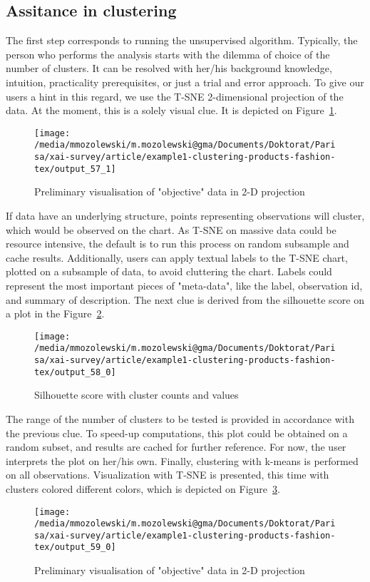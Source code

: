 \documentclass[
 twocolumn,
]{ceurart}
\begin{document}
\subsection{Assitance in clustering}
The first step corresponds to running the unsupervised algorithm.
Typically, the person who performs the analysis starts with the dilemma of choice of the number of clusters.
It can be resolved with her/his background knowledge, intuition, practicality prerequisites, or just a trial and error approach. %
To give our users a hint in this regard, we use the T-SNE 2-dimensional projection of the data.
At the moment, this is a solely visual clue.
It is depicted on Figure~\ref{fig:tsne}.
\begin{figure}[h!]
  \centering
  \texttt{[image: /media/mmozolewski/m.mozolewski@gma/Documents/Doktorat/Parisa/xai-survey/article/example1-clustering-products-fashion-tex/output\_57\_1]}
  \caption{Preliminary visualisation of "objective" data in 2-D projection}
  \label{fig:tsne}
\end{figure}
If data have an underlying structure, points representing observations will cluster, which would be observed on the chart.
As T-SNE on massive data could be resource intensive, the default is to run this process on random subsample and cache results.
Additionally, users can apply textual labels to the T-SNE chart, plotted on a subsample of data, to avoid cluttering the chart. %
Labels could represent the most important pieces of "meta-data", like the label, observation id, and summary of description.
The next clue is derived from the silhouette score on a plot in the Figure~\ref{fig:silhouette}.
\begin{figure}[h!]
  \centering
  \texttt{[image: /media/mmozolewski/m.mozolewski@gma/Documents/Doktorat/Parisa/xai-survey/article/example1-clustering-products-fashion-tex/output\_58\_0]}
  \caption{Silhouette score with cluster counts and values}
  \label{fig:silhouette}
\end{figure}
The range of the number of clusters to be tested is provided in accordance with the previous clue.
To speed-up computations, this plot could be obtained on a random subset, and results are cached for further reference.
For now, the user interprets the plot on her/his own.
Finally, clustering with k-means is performed on all observations.
Visualization with T-SNE is presented, this time with clusters colored different colors, which is depicted on Figure~\ref{fig:kmeans}.
\begin{figure}[h!]
  \centering
  \texttt{[image: /media/mmozolewski/m.mozolewski@gma/Documents/Doktorat/Parisa/xai-survey/article/example1-clustering-products-fashion-tex/output\_59\_0]}
  \caption{Preliminary visualisation of "objective" data in 2-D projection}
  \label{fig:kmeans}
\end{figure}
\end{document}
